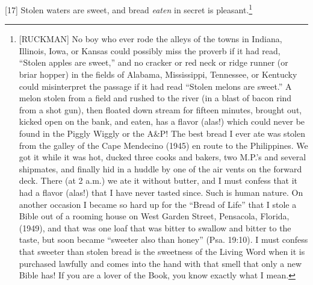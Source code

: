 [17] \textcolor[rgb]{0.00,0.00,1.00}{Stolen waters are sweet, and bread \emph{eaten} in secret is pleasant.}\footnote{[RUCKMAN] No boy who ever rode the alleys of the towns in Indiana, Illinois, Iowa, or Kansas could possibly miss the proverb if it had read, ``Stolen apples are sweet,'' and no cracker or red neck or ridge runner (or briar hopper) in the fields of Alabama, Mississippi, Tennessee, or Kentucky could misinterpret the passage if it had read “Stolen melons are sweet.” A melon stolen from a field and rushed to the river (in a blast of bacon rind from a shot gun), then floated down stream for fifteen minutes, brought out, kicked open on the bank, and eaten, has a flavor (alas!) which could never be found in the Piggly Wiggly or the A\&P! The best bread I ever ate was stolen from the galley of the Cape Mendecino (1945) en route to the Philippines. We got it while it was hot, ducked three cooks and bakers, two M.P.’s and several shipmates, and finally hid in a huddle by one of the air vents on the forward deck. There (at 2 a.m.) we ate it without butter, and I must confess that it had a flavor (alas!) that I have never tasted since. Such is human nature. On another occasion I became so hard up for the “Bread of Life” that I stole a Bible out of a rooming house on West Garden Street, Pensacola, Florida, (1949), and that was one loaf that was bitter to swallow and bitter to the taste, but soon became “sweeter also than honey” (Psa. 19:10). I must confess that sweeter than stolen bread is the sweetness of  the Living Word when it is purchased lawfully and comes into the hand with that smell that only a new Bible has! If you are a lover of the Book, you know exactly what I mean.\cite{Ruckman1972Proverbs}  }
